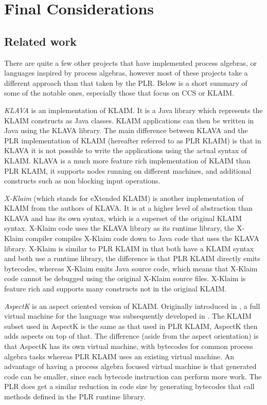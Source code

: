 \chapter{Final Considerations}

\section{Related work}\label{sec:related_work}
	
	There are quite a few other projects that have implemented process algebras, 
	or languages inspired by process algebras, however most of these projects 
	take a different approach than that taken by the PLR. Below is a short 
	summary of some of the notable ones, especially those that focus on CCS or 
	KLAIM.
	
	\textit{KLAVA} \cite{klava} is an implementation of KLAIM. It is a Java 
	library which represents the KLAIM constructs as Java classes. KLAIM 
	applications can then be written in Java using the KLAVA library. The main 
	difference between KLAVA and the PLR implementation of KLAIM (hereafter 
	referred to as PLR KLAIM) is that in KLAVA it is not possible to write the 
	applications using the actual syntax of KLAIM. KLAVA is a much more feature 
	rich implementation of KLAIM than PLR KLAIM, it supports nodes running on 
	different machines, and additional constructs such as non blocking input 
	operations.
	
	\textit{X-Klaim} \cite{xklaim} (which stands for eXtended KLAIM) is another 
	implementation of KLAIM from the authors of KLAVA. It is at a higher level 
	of abstraction than KLAVA and has its own syntax, which is a superset of
	the original KLAIM syntax. X-Klaim code uses the KLAVA library as its 
	runtime library, the X-Klaim compiler compiles X-Klaim code down to Java 
	code that uses the KLAVA library. X-Klaim is similar to PLR KLAIM in that 
	both have a KLAIM syntax and both use a runtime library, the difference is 
	that PLR KLAIM directly emits bytecodes, whereas X-Klaim emits Java source 
	code, which means that X-Klaim code cannot be debugged using the original
	X-Klaim source files. X-Klaim is feature rich and supports many constructs
	not in the original KLAIM.
	
	\textit{AspectK} is an aspect oriented version of KLAIM. Originally 
	introduced in \cite{aspectk}, a full virtual machine for the language was 
	subsequently developed in \cite{giordano}. The KLAIM subset used in AspectK 
	is the same as that used in PLR KLAIM, AspectK then adds aspects on top of 
	that. The difference (aside from the aspect orientation) is that AspectK has 
	its own virtual machine, with bytecodes for common process algebra tasks 
	whereas PLR KLAIM uses an existing virtual machine. An advantage of having a 
	process algebra focused virtual machine is that generated code can be 
	smaller, since each bytecode instruction can perform more work. The PLR does 
	get a similar reduction in code size by generating bytecodes that call 
	methods defined in the PLR runtime library.
	
